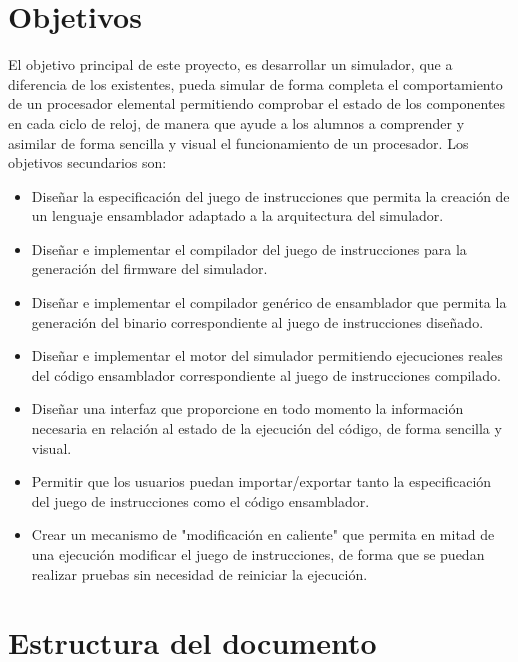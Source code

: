 \section{Objetivos}
\label{sec:objectives}

El objetivo principal de este proyecto, es desarrollar un simulador, que a diferencia de los existentes, pueda simular de forma completa el comportamiento de un procesador elemental permitiendo comprobar el estado de los componentes en cada ciclo de reloj, de manera que ayude a los alumnos a comprender y asimilar de forma sencilla y visual el funcionamiento de un procesador. Los objetivos secundarios son:

\begin{itemize}

\item Diseñar la especificación del juego de instrucciones que permita la creación de un lenguaje ensamblador adaptado a la arquitectura del simulador.

\item Diseñar e implementar el compilador del juego de instrucciones para la generación del firmware del simulador.

\item Diseñar e implementar el compilador genérico de ensamblador que permita la generación del binario correspondiente al juego de instrucciones diseñado.

\item Diseñar e implementar el motor del simulador permitiendo ejecuciones reales del código ensamblador correspondiente al juego de instrucciones compilado.

\item Diseñar una interfaz que proporcione en todo momento la información necesaria en relación al estado de la ejecución del código, de forma sencilla y visual.

\item Permitir que los usuarios puedan importar/exportar tanto la especificación del juego de instrucciones como el código ensamblador.

\item Crear un mecanismo de "modificación en caliente" que permita en mitad de una ejecución modificar el juego de instrucciones, de forma que se puedan realizar pruebas sin necesidad de reiniciar la ejecución.

\end{itemize}

\section{Estructura del documento}
\label{sec:document_structure}

